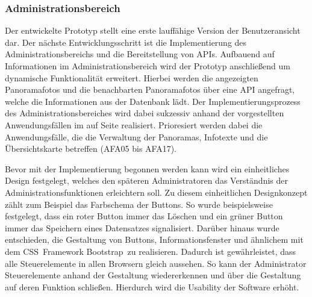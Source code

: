 \subsubsection{Administrationsbereich}
\label{sec:UmsetzungAdministrationsbereich}

Der entwickelte Prototyp stellt eine erste lauffähige Version der
Benutzeransicht dar. Der nächste Entwicklungsschritt ist die Implementierung
des Administrationsbereichs und die Bereitstellung von APIs. Aufbauend auf
Informationen im Administrationsbereich wird der Prototyp anschließend um
dynamische Funktionalität erweitert. Hierbei werden die angezeigten
Panoramafotos und die benachbarten Panoramafotos über eine API angefragt,
welche die Informationen aus der Datenbank lädt. Der Implementierungsprozess des
Administrationsbereiches wird dabei sukzessiv anhand der vorgestellten
Anwendungsfällen im  auf Seite
\pageref{sec:Adminstratoranwendungen} realisiert. Prioresiert werden dabei die
Anwendungsfälle, die die Verwaltung der Panoramas, Infotexte und die
Übersichtskarte betreffen (AFA05 bis AFA17).

Bevor mit der Implementierung begonnen werden kann wird ein einheitliches
Design festgelegt, welches den späteren Administratoren das Verständnis der
Administrationsfunktionen erleichtern soll. Zu diesem einheitlichen
Designkonzept zählt zum Beispiel das Farbschema der Buttons. So wurde
beispielsweise festgelegt, dass ein roter Button immer das Löschen und ein
grüner Button immer das Speichern eines Datensatzes signalisiert. Darüber hinaus
wurde entschieden, die Gestaltung von Buttons, Informationsfenster und
ähnlichem mit dem CSS\footnotemark\ Framework Bootstrap\footnotemark\ zu realisieren.
Dadurch ist gewährleistet, dass alle Steuerelemente in allen Browsern
gleich aussehen. So kann der Administrator Steuerelemente anhand der Gestaltung
wiedererkennen und über die Gestaltung auf deren Funktion schließen. Hierdurch
wird die Usability der Software erhöht.



